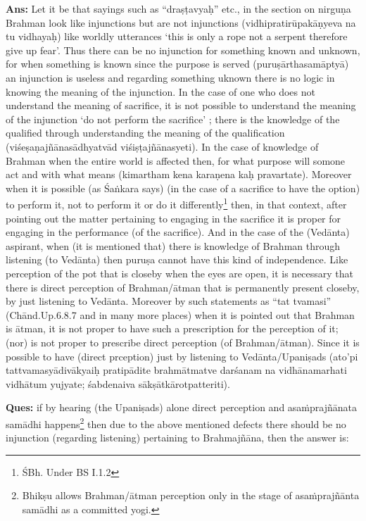 \textbf{Ans:}  Let it be that sayings such as “draṣṭavyaḥ” etc., in the section on nirguṇa Brahman look like injunctions but are not injunctions (vidhipratirūpakāṇyeva na tu vidhayaḥ) like worldly utterances ‘this is only a rope not a serpent therefore give up fear’. Thus there can be no injunction for something known and unknown, for when something is known since the purpose is served (puruṣārthasamāptyā) an injunction is useless and regarding something uknown there is no logic in knowing the meaning of the injunction.  In the case of one who does not understand the meaning of sacrifice,  it is not possible to understand the meaning of the injunction ‘do not perform the sacrifice’ ; there is the knowledge of the qualified through understanding the meaning of the qualification (viśeṣaṇajñānasādhyatvād viśiṣṭajñānasyeti).  In the case of knowledge of Brahman when the entire world is affected then, for what purpose will somone act and with what means (kimartham kena karaṇena kaḥ pravartate). Moreover when it is possible (as Śaṅkara says) (in the case of a sacrifice to have the option) to perform it, not to perform it or do it differently\footnote{ŚBh. Under BS I.1.2} then, in that context, after pointing out the matter pertaining to engaging in the sacrifice it is proper for engaging in the performance (of the sacrifice). And in the case of the (Vedānta) aspirant, when (it is mentioned that) there is knowledge of Brahman through listening (to Vedānta) then puruṣa cannot have this kind of independence. Like perception of the pot that is closeby when the eyes are open, it is necessary that there is direct perception of Brahman/ātman that is permanently present closeby, by just listening to Vedānta. Moreover by such statements as “tat tvamasi” (Chānd.Up.6.8.7 and in many more places) when it is pointed out that Brahman is ātman, it is not proper to have such a prescription for the perception of it;  (nor) is not proper to prescribe direct perception (of Brahman/ātman). Since it is possible to have (direct prception) just by listening to Vedānta/Upaniṣads (ato’pi tattvamasyādivākyaiḥ pratipādite brahmātmatve darśanam na vidhānamarhati vidhātum yujyate; śabdenaiva sākṣātkārotpatteriti).

\textbf{Ques:} if by hearing (the Upaniṣads) alone direct perception and asaṁprajñānata samādhi happens\footnote{Bhikṣu allows Brahman/ātman perception only in the stage of asaṁprajñānta samādhi as a committed yogi.} then due to the above mentioned defects there should be no injunction (regarding listening) pertaining to Brahmajñāna, then the answer is:

